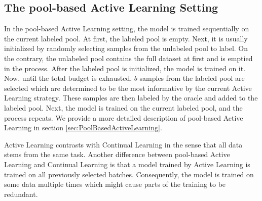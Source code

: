 \subsection{The pool-based Active Learning Setting}
\label{sec:Methodology:ALSetting}
In the pool-based Active Learning setting, the model is trained sequentially on the current labeled pool. At first, the labeled pool is empty. Next, it is usually
initialized by randomly selecting samples from the unlabeled pool to label. On the contrary, the unlabeled pool contains the full dataset at first and is emptied in the process.
After the labeled pool is initialized, the model is trained on it. Now, until the total budget is exhausted, $b$ samples from the labeled pool are selected which
are determined to be the most informative by the current Active Learning strategy. These samples are then labeled by the oracle and added to the labeled pool. Next, the
model is trained on the current labeled pool, and the process repeats. We provide a more detailed description of pool-based Active Learning in section \ref{sec:PoolBasedActiveLearning}. \par
Active Learning contrasts with Continual Learning in the sense that all data stems from the same task. Another difference between pool-based Active Learning and Continual
Learning is that a model trained by Active Learning is trained on all previously selected batches. Consequently, the model is trained on some data multiple times which
might cause parts of the training to be redundant.

